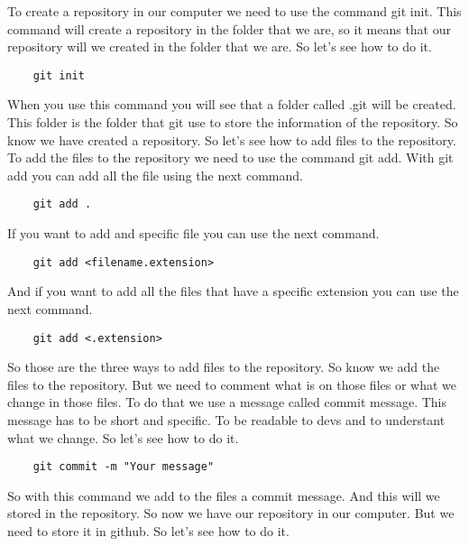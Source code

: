 \documentclass{article}
\begin{document}
To create a repository in our computer we need to use the command git init. This command will create a repository in the 
folder that we are, so it means that our repository will we created in the folder that we are. So let's see how to do it.
\begin{lstlisting}
    git init
\end{lstlisting}
When you use this command you will see that a folder called .git will be created. This folder is the folder that git use to
store the information of the repository. So know we have created a repository. So let's see how to add files to 
the repository. To add the files to the repository we need to use the command git add. With git add you can add all the file using 
the next command.
\begin{lstlisting}
    git add .
\end{lstlisting}
If you want to add and specific file you can use the next command.
\begin{lstlisting}
    git add <filename.extension>
\end{lstlisting}
And if you want to add all the files that have a specific extension you can use the next command.
\begin{lstlisting}
    git add <.extension>
\end{lstlisting}
So those are the three ways to add files to the repository. So know we add the files to the repository. But we need to 
comment what is on those files or what we change in those files. To do that we use a message called commit message. 
This message has to be short and specific. To be readable to devs and to understant what we change. So let's see how to do it.
\begin{lstlisting}
    git commit -m "Your message"
\end{lstlisting}
So with this command we add to the files a commit message. And this will we stored in the repository. So now we have our repository
in our computer. But we need to store it in github. So let's see how to do it.
\end{document}
